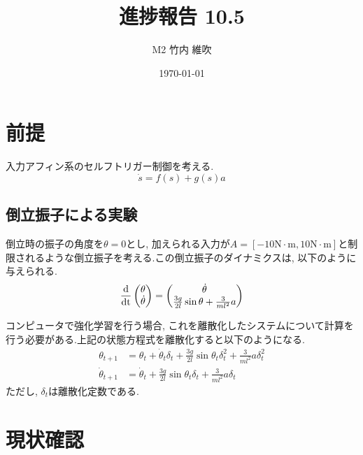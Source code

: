 \documentclass{jsarticle}
\title{\large{\bf{進捗報告 10.5}}}
\author{M2 竹内 維吹}
\date{\today}
\newcommand{\odif}[2]{\frac{\rm{d}#1}{\rm{d}#2}}
\begin{document}
\maketitle


\section{前提}
入力アフィン系のセルフトリガー制御を考える. 
\begin{equation}
	\dot{s} = f(s) + g(s)a \label{continuous}
\end{equation}

\subsection{倒立振子による実験}
倒立時の振子の角度を$\theta=0$とし, 加えられる入力が$A=[-10\textrm{N}\cdot\textrm{m},10\textrm{N}\cdot\textrm{m}]$と制限されるような倒立振子を考える.この倒立振子のダイナミクスは, 以下のように与えられる.
\begin{equation}
	\odif{}{t}\begin{pmatrix}\theta \\ \dot{\theta}\end{pmatrix} = 
		\begin{pmatrix}\dot{\theta} \\ \frac{3g}{2l}\sin{\theta} + \frac{3}{ml^2}a \end{pmatrix} \label{pendulum}
\end{equation}

コンピュータで強化学習を行う場合, これを離散化したシステムについて計算を行う必要がある.上記の状態方程式を離散化すると以下のようになる.
\begin{align}
	\theta_{t+1} &= \theta_t+\dot{\theta}_t\delta_t+\frac{3g}{2l}\sin{\theta_t}\delta_t^2+\frac{3}{ml^2}a\delta_t^2 \tag{3a}\\
	\dot{\theta}_{t+1} &=  \dot{\theta}_t+\frac{3g}{2l}\sin{\theta_t}\delta_t+\frac{3}{ml^2}a\delta_t \tag{3b}
\end{align}\label{pend}
\setcounter{equation}{3}
ただし, $\delta_t$は離散化定数である.\par


\section{現状確認}
\end{document}

